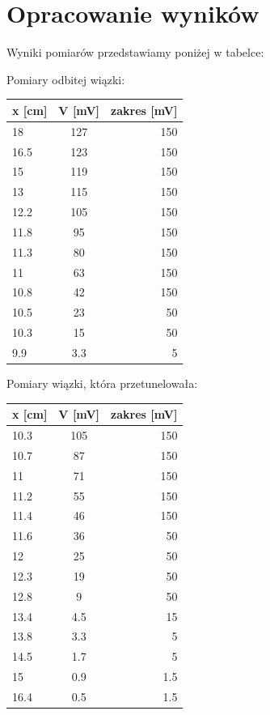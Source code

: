 \documentclass[a4paper,12pt]{article}
\begin{document}
\section{Opracowanie wyników}

Wyniki pomiarów przedstawiamy poniżej w tabelce:

Pomiary odbitej wiązki:

\begin{tabular}{ l | c | r }
  		x [cm] & V [mV] & zakres [mV] \\
  		\hline
		18&127&150 \\
		16.5&123&150 \\
		15&119&150 \\
		13&115&150 \\
		12.2&105&150 \\
		11.8&95&150 \\
		11.3&80&150 \\
		11&63&150 \\
		10.8&42&150 \\
		10.5&23&50 \\
		10.3&15&50 \\
		9.9&3.3&5 \\


\end{tabular}

Pomiary wiązki, która przetunelowała:

\begin{tabular}{ l | c | r }

	x [cm] & V [mV] & zakres [mV] \\
	\hline
	10.3&105&150 \\
	10.7&87&150 \\
	11&71&150 \\
	11.2&55&150 \\
	11.4&46&150 \\
	11.6&36&50 \\
	12&25&50 \\
	12.3&19&50 \\
	12.8&9&50 \\
	13.4&4.5&15 \\
	13.8&3.3&5 \\
	14.5&1.7&5 \\
	15&0.9&1.5 \\
	16.4&0.5&1.5 \\

\end{tabular}
\end{document}
